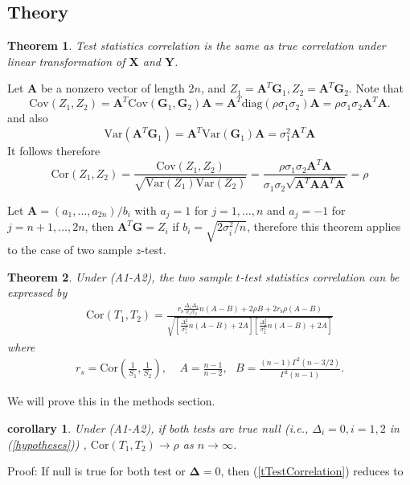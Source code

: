 \documentclass[12pt, a4paper]{article}
\newtheorem{theorem}{Theorem}       %
\newtheorem{corollary}{corollary}
\begin{document}
	\subsection{Theory}
	\begin{theorem} 
		Test statistics correlation is the same as true correlation under linear transformation of $\bm X$
		and $\bm Y$.
	\end{theorem}
	Let $\bm A$ be a nonzero vector of length $2n$, and $Z_1 =\bm A^T\bm G_1, Z_2 = \bm A^T\bm G_2$. 
	Note that \[
	\text{Cov}(Z_1, Z_2) = \bm A^T\text{Cov}(\bm G_1, \bm G_2)\bm A = \bm
	A^T\text{diag}(\rho\sigma_1\sigma_2)\bm A =\rho\sigma_1\sigma_2\bm A^T\bm A.\]
	and also
	\[\text{Var}(\bm A^T\bm G_1) = \bm A^T\text{Var}(\bm G_1)\bm A = \sigma_1^2\bm A^T\bm A\]
	It follows therefore 
	\[\text{Cor}(Z_1, Z_2) = \frac{\text{Cov}(Z_1, Z_2) }{\sqrt{\text{Var}(Z_1)\text{Var}(Z_2)}} =
	\frac{\rho\sigma_1\sigma_2\bm A^T\bm A}{\sigma_1\sigma_2 \sqrt{\bm A^T\bm A\bm A^T\bm A}}=\rho\]
	
	Let $\bm A = (a_1, \ldots, a_{2n}) /b_i$ with $a_j = 1$ for $j = 1, \ldots, n$ and $a_j = -1$ for $j
	=n+1, \ldots, 2n$, then $\bm A^T \bm G = Z_i$ if $b_i = \sqrt{2\sigma_i^2 /n}$, therefore this
	theorem applies to the case of two sample $z$-test.
	
	\begin{theorem}\label{theoremTstat} 
		Under (A1-A2),  the two sample $t$-test statistics correlation can be expressed by 
		\begin{align}\label{tTestCorrelation}
			\text{Cor}(T_1, T_2)  = \frac{r_{\text{s}}\frac{\Delta_1\Delta_2}{\sigma_1\sigma_2}n(A-B) + 2\rho B
				+ 2r_{\text{s}}\rho(A-B)}{\sqrt{\left[ \frac{\Delta_1^2}{\sigma_1^2}n(A-B) + 2
					A\right]\left[\frac{\Delta_2^2}{\sigma_2^2}n(A-B) + 2 A\right]}}
		\end{align} where 
		\begin{align}\label{invScor}
			r_s = \text{Cor}(\frac{1}{S_1}, \frac{1}{S_2}), ~~~~~A = \frac{n-1}{n-2}, ~~~B =
			\frac{(n-1)\Gamma^2(n-3/2)}{\Gamma^2(n-1)}.
		\end{align}
	\end{theorem}
	We will prove this in the methods section.
	
	\begin{corollary} 
		Under (A1-A2), if both tests are true null (i.e., $\Delta_i = 0, i=1, 2$ in (\ref{hypotheses})) ,
		$\text{Cor}({T_1, T_2})\rightarrow \rho$ as $n \rightarrow \infty$. 
	\end{corollary}
	Proof:  If null is true for both test or $\bm \Delta  = 0$, then (\ref{tTestCorrelation}) reduces to
	
\end{document}

